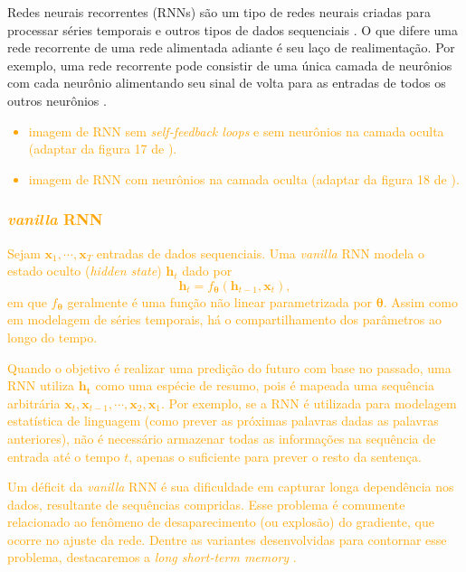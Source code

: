\documentclass{automatextcc}
\newcommand{\nico}[1]{\textcolor{orange}{#1}}
\newcommand{\bs}[1]{\boldsymbol{#1}}
\begin{document}
Redes neurais recorrentes (RNNs) são um tipo de redes neurais criadas para processar séries temporais e outros tipos de dados sequenciais \citep{fan2021}. O que difere uma rede recorrente de uma rede alimentada adiante é seu laço de realimentação. Por exemplo, uma rede recorrente pode consistir de uma única camada de neurônios com cada neurônio alimentando seu sinal de volta para as entradas de todos os outros neurônios \citep{haykin2009}. 

\nico{
\begin{itemize}
    \item imagem de RNN sem \textit{self-feedback loops} e sem neurônios na camada oculta (adaptar da figura 17 de \citet{haykin2009}).
    \item imagem de RNN com neurônios na camada oculta (adaptar da figura 18 de \citet{haykin2009}).
\end{itemize}
}

\subsubsection{\nico{\textit{vanilla} RNN}}
\nico{
Sejam $\bs{x}_{1},\cdots,\bs{x}_{T}$ entradas de dados sequenciais. Uma \textit{vanilla} RNN modela o estado oculto (\textit{hidden state}) $\bs{h}_{t}$ dado por
\begin{equation*}
    \bs{h}_t = f_{\bs{{\theta}}} (\bs{h}_{t-1}, \bs{x}_{t}),    
\end{equation*}
em que $f_{\bs{\theta}}$ geralmente é uma função não linear parametrizada por $\bs{\theta}$. Assim como em modelagem de séries temporais, há o compartilhamento dos parâmetros ao longo do tempo.
}

\nico{
Quando o objetivo é realizar uma predição do futuro com base no passado, uma RNN utiliza $\bs{h_t}$ como uma espécie de resumo, pois é mapeada uma sequência arbitrária $\bs{x}_{t},\bs{x}_{t-1},\cdots,\bs{x}_{2},\bs{x}_{1}$. Por exemplo, se a RNN é utilizada para modelagem estatística de linguagem (como prever as próximas palavras dadas as palavras anteriores), não é necessário armazenar todas as informações na sequência de entrada até o tempo $t$, apenas o suficiente para prever o resto da sentença.
}

\nico{
Um déficit da \textit{vanilla} RNN é sua dificuldade em capturar longa dependência nos dados, resultante de sequências compridas. Esse problema é comumente relacionado ao fenômeno de desaparecimento (ou explosão) do gradiente, que ocorre no ajuste da rede. Dentre as variantes desenvolvidas para contornar esse problema, destacaremos a \textit{long short-term memory} \citep{goodfellow2016, fan2021}.
}
\end{document}
